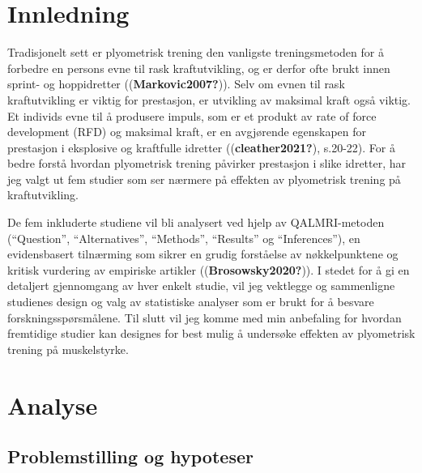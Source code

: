 \documentclass[
  letterpaper,
  DIV=11,
  numbers=noendperiod]{scrreprt}
\begin{document}

\chapter{Innledning}\label{innledning}

Tradisjonelt sett er plyometrisk trening den vanligste treningsmetoden
for å forbedre en persons evne til rask kraftutvikling, og er derfor
ofte brukt innen sprint- og hoppidretter ((\textbf{Markovic2007?})).
Selv om evnen til rask kraftutvikling er viktig for prestasjon, er
utvikling av maksimal kraft også viktig. Et individs evne til å
produsere impuls, som er et produkt av rate of force development (RFD)
og maksimal kraft, er en avgjørende egenskapen for prestasjon i
eksplosive og kraftfulle idretter ((\textbf{cleather2021?}), s.20-22).
For å bedre forstå hvordan plyometrisk trening påvirker prestasjon i
slike idretter, har jeg valgt ut fem studier som ser nærmere på effekten
av plyometrisk trening på kraftutvikling.

De fem inkluderte studiene vil bli analysert ved hjelp av QALMRI-metoden
(``Question'', ``Alternatives'', ``Methods'', ``Results'' og
``Inferences''), en evidensbasert tilnærming som sikrer en grudig
forståelse av nøkkelpunktene og kritisk vurdering av empiriske artikler
((\textbf{Brosowsky2020?})). I stedet for å gi en detaljert gjennomgang
av hver enkelt studie, vil jeg vektlegge og sammenligne studienes design
og valg av statistiske analyser som er brukt for å besvare
forskningsspørsmålene. Til slutt vil jeg komme med min anbefaling for
hvordan fremtidige studier kan designes for best mulig å undersøke
effekten av plyometrisk trening på muskelstyrke.


\chapter{Analyse}\label{analyse}

\section{Problemstilling og
hypoteser}\label{problemstilling-og-hypoteser}
\end{document}

